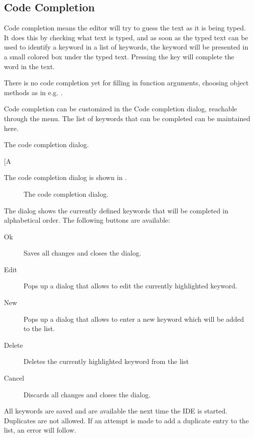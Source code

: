 \subsection{Code Completion}
\label{se:codecompletion}
Code completion means the editor will try to guess the text as it
is being typed. It does this by checking what text is typed, and as soon
as the typed text can be used to identify a keyword in a list of keywords,
the keyword will be presented in a small colored box under the typed text. 
Pressing the  key will complete the word in the text.

There is no code completion yet for filling in function arguments, choosing
object methods as in e.g. \delphi.

Code completion can be customized in the Code completion dialog, reachable 
through the  menu.
The list of keywords that can be completed can be maintained here. 

\begin{htmlonly}
The code completion dialog.
\end{htmlonly}
[A\begin{latexonly}
The code completion dialog is shown in .
\begin{figure}[ht]
\caption{The code completion dialog.}\label{fig:codecomp}
\ifpdf
{}
\else
{}
\fi
\end{figure}
\end{latexonly}
The dialog shows the currently defined keywords that will be completed in
alphabetical order.
The following buttons are available:
\begin{description}
\item[Ok] Saves all changes and closes the dialog.
\item[Edit] Pops up a dialog that allows to edit the currently 
highlighted keyword.
\item[New] Pops up a dialog that allows to enter a new keyword which will be
added to the list.
\item[Delete] Deletes the currently highlighted keyword from the list
\item[Cancel] Discards all changes and closes the dialog.
\end{description}
All keywords are saved and are available the next time the IDE is started.
Duplicates are not allowed. If an attempt is made to add a duplicate entry 
to the list, an error will follow.

